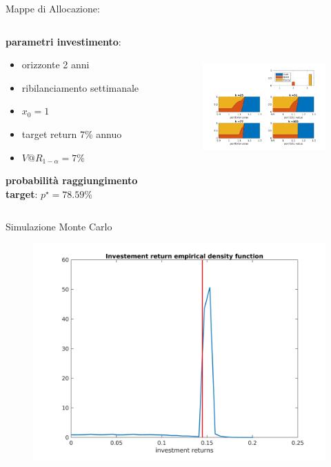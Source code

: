 \begin{frame}{Mappe di Allocazione: }
	\begin{columns}
		\begin{column}{0.35\textwidth}
			\textbf{parametri investimento}:
				\begin{itemize}
					\item orizzonte 2 anni
					\item ribilanciamento settimanale
					\item  $x_0=1$
					\item target return 7\% annuo
					\item $V@R_{1-\alpha} = 7\%$
				\end{itemize}
			
			\textbf{probabilità raggiungimento target}:
			$p^{\star} = 78.59\%$
			
		\end{column}
		\begin{column}{0.65\textwidth}
			\begin{figure}
				\centering
				\includegraphics[height=5.5cm]{Images/mapsMixturewk}
			\end{figure}
		\end{column}
	\end{columns}
	
	
\end{frame}

\begin{frame}{Simulazione Monte Carlo}
	\begin{figure}
		\centering
		\includegraphics[width=0.8\linewidth]{Images/DensityODAAwk}
	\end{figure}
\end{frame}

	